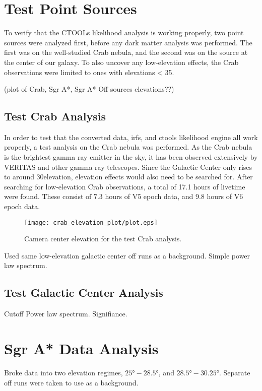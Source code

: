 \section{Test Point Sources}
To verify that the CTOOLs likelihood analysis is working properly, two point sources were analyzed first, before any dark matter analysis was performed.
The first was on the well-studied Crab nebula, and the second was on the source at the center of our galaxy.
To also uncover any low-elevation effects, the Crab observations were limited to ones with elevations < 35\degree.

(plot of Crab, Sgr A*, Sgr A* Off sources elevations??)

\subsection{Test Crab Analysis}

In order to test that the converted data, irfs, and ctools likelihood engine all work properly, a test analysis on the Crab nebula was performed.
As the Crab nebula is the brightest gamma ray emitter in the sky, it has been observed extensively by VERITAS and other gamma ray telescopes.
Since the Galactic Center only rises to around 30\degree elevation, elevation effects would also need to be searched for.
After searching for low-elevation Crab observations, a total of 17.1 hours of livetime were found.
These consist of 7.3 hours of V5 epoch data, and 9.8 hours of V6 epoch data.

\begin{figure}[ht]
  \begin{center}
    \texttt{[image: crab\_elevation\_plot/plot.eps]}
    \caption[Crab Test Analysis Elevation Pointing]{Camera center elevation for the test Crab analysis.}\label{fig:crabtestelevations}
  \end{center}
\end{figure}


Used same low-elevation galactic center off runs as a background.
Simple power law spectrum.

\subsection{Test Galactic Center Analysis}

Cutoff Power law spectrum.
Signifiance.

\section{Sgr A* Data Analysis}
Broke data into two elevation regimes, $ \ang{25}-\ang{28.5} $, and $ \ang{28.5}-\ang{30.25} $.
Separate off runs were taken to use as a background.


